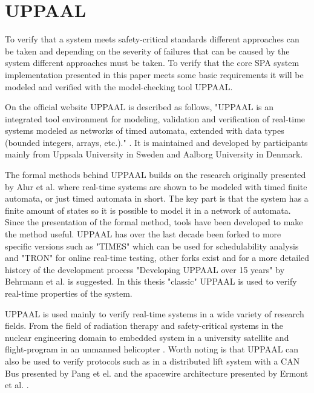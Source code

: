 
\section{UPPAAL}
To verify that a system meets safety-critical standards different approaches
can be taken and depending on the severity of failures that can be caused by
the system different approaches must be taken. To verify that the core SPA
system implementation presented in this paper meets some basic requirements it
will be modeled and verified with the model-checking tool UPPAAL.

On the official website UPPAAL is described as follows, "UPPAAL is an
integrated tool environment for modeling, validation and verification of
real-time systems modeled as networks of timed automata, extended with data
types (bounded integers, arrays, etc.)." \cite{web:uppaal}. It is maintained
and developed by participants mainly from Uppsala University in Sweden and
Aalborg University in Denmark.

The formal methods behind UPPAAL builds on the research originally presented
by Alur et al. \cite{alur1994} where real-time systems are shown to be modeled
with timed finite automata, or just timed automata in short. The key part is
that the system has a finite amount of states so it is possible to model it in a
network of automata. Since the presentation of the formal method, tools have
been developed to make the method useful. UPPAAL has over the last decade been
forked to more specific versions such as "TIMES" which can be used for
schedulability analysis and "TRON" for online real-time testing, other forks
exist and for a more detailed history of the development process "Developing
UPPAAL over 15 years" by Behrmann et al.  \cite{behrmann2011} is suggested. In
this thesis "classic" UPPAAL is used to verify real-time properties of the
system.

UPPAAL is used mainly to verify real-time systems in a wide variety of research
fields. From the field of radiation therapy \cite{man2011} and safety-critical
systems in the nuclear engineering domain \cite{lahtinen2012} to embedded
system in a university satellite \cite{alencar2013} and flight-program in an
unmanned helicopter \cite{lee2011}. Worth noting is that UPPAAL can also be used
to verify protocols such as in a distributed lift system with a CAN Bus
presented by Pang et el. \cite{pang2003} and the spacewire architecture
presented by Ermont et al. \cite{ermont2013}.

